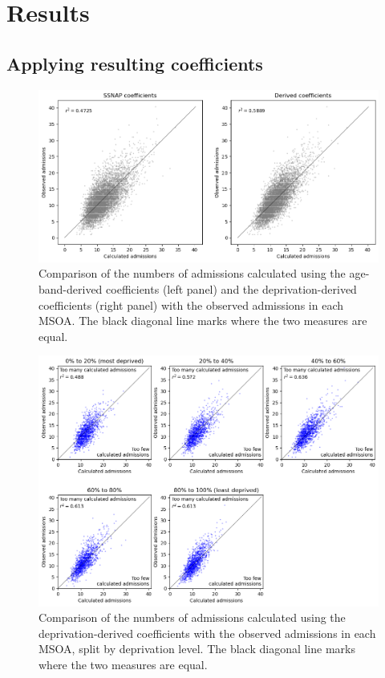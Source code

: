 \documentclass[12pt]{extarticle}
\begin{document}
\section{Results}

\subsection{Applying resulting coefficients}


\begin{figure}
    \centering
    \includegraphics[width=1.0\linewidth]{images/admissions_prediction_comparison.png}
    \caption{Comparison of the numbers of admissions calculated using the age-band-derived coefficients (left panel) and the deprivation-derived coefficients (right panel) with the observed admissions in each MSOA. The black diagonal line marks where the two measures are equal.}
    \label{fig:admissions_prediction_comparison}
\end{figure}


\begin{figure}
    \centering
    \includegraphics[width=1.0\linewidth]{images/admissions_prediction_comparison_separate.png}
    \caption{Comparison of the numbers of admissions calculated using the deprivation-derived coefficients with the observed admissions in each MSOA, split by deprivation level. The black diagonal line marks where the two measures are equal.}
    \label{fig:admissions_prediction_comparison_separate}
\end{figure}
\end{document}
